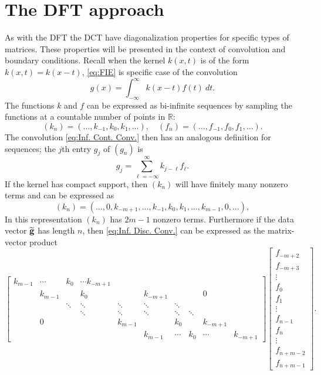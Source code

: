 \chapter{The DFT approach} \label{ch:DFT}
As with the DFT the DCT have diagonalization properties for specific types of matrices. These properties will be presented in the context of convolution and boundary conditions. Recall when the kernel $k(x,t)$ is of the form $k(x,t) = k(x-t)$, \eqref{eq:FIE} is specific case of the convolution
\begin{equation}
\label{eq:Inf. Cont. Conv.}
g(x) = \int_{-\infty}^{\infty} k(x-t)f(t) ~dt.
\end{equation}
The functions $k$ and $f$ can be expressed as bi-infinite sequences by sampling the functions at a countable number of points in $\mathbb{R}$:
\[(k_n) = (\ldots,k_{-1},k_{0},k_{1},\ldots), \quad (f_n) = (\ldots,f_{-1},f_{0},f_{1},\ldots).\]
The convolution \eqref{eq:Inf. Cont. Conv.} then has an analogous definition for sequences; the $j$th entry $g_j$ of $(g_n)$ is
\begin{equation}
\label{eq:Inf. Disc. Conv.}
g_j = \sum_{\ell=-\infty}^{\infty} k_{j-\ell}f_{\ell}.
\end{equation}
If the kernel has compact support, then $(k_n)$ will have finitely many nonzero terms and can be expressed as
\begin{equation}
\label{eq:Kernel seq.}
(k_n) = (\ldots,0,k_{-m+1},\ldots,k_{-1},k_{0},k_{1},\ldots,k_{m-1},0,\ldots),
\end{equation}
In this representation $(k_n)$ has $2m-1$ nonzero terms. Furthermore if the data vector $\widetilde{\mathbf{g}}$ has length $n$, then \eqref{eq:Inf. Disc. Conv.} can be expressed as the matrix-vector product
\begin{equation}
\label{eq:FIEv. Prod.}
\begin{bmatrix}
k_{m-1} & \cdots & k_0 & \cdots k_{-m+1} & & & & & \\
 & k_{m-1} & & k_0 & & k_{-m+1} & & & 0 & \\
 & & \ddots & \ddots & \ddots & \ddots & \ddots & & & \\
 & & & \ddots & \ddots & \ddots & \ddots & \ddots & & \\
 & 0 & & & k_{m-1} & & k_0 & & k_{-m+1} & \\
 & & & & & k_{m-1} & \cdots & k_0 & \cdots & k_{-m+1}
\end{bmatrix}\begin{bmatrix}
f_{-m+2} \\
f_{-m+3} \\
\vdots \\
f_0 \\
f_1 \\
\vdots \\
f_{n-1} \\
f_n \\
\vdots \\
f_{n+m-2} \\
f_{n+m-1}
\end{bmatrix}.
\end{equation}
